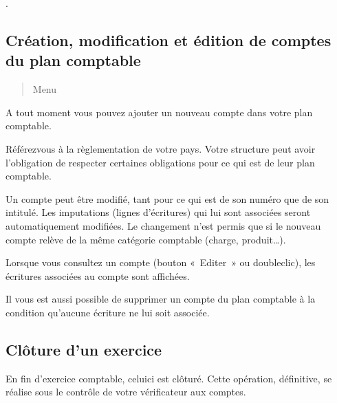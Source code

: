 \documentclass[a4paper,10pt,oneside,french]{sphinxmanual}
\begin{document}
.


\subsection{Création, modification et édition de comptes du plan comptable}
\label{\detokenize{accounting/fiscalyear:creation-modification-et-edition-de-comptes-du-plan-comptable}}\begin{quote}

Menu 
\end{quote}

A tout moment vous pouvez ajouter un nouveau compte dans votre plan comptable.
\begin{quote}

\noindent{}
\end{quote}

Référez\sphinxhyphen{}vous à la règlementation de votre pays. Votre structure peut avoir l’obligation de respecter certaines obligations pour ce qui est de leur plan comptable.

Un compte peut être modifié, tant pour ce qui est de son numéro que de son intitulé. Les imputations (lignes d’écritures) qui lui sont associées seront automatiquement modifiées. Le changement n’est permis que si le nouveau compte relève de la même catégorie comptable (charge, produit…).

Lorsque vous consultez un compte (bouton « Editer » ou double\sphinxhyphen{}clic), les écritures associées au compte sont affichées.
\begin{quote}

\noindent{}
\end{quote}

Il vous est aussi possible de supprimer un compte du plan comptable à la condition qu’aucune écriture ne lui soit associée.


\subsection{Clôture d’un exercice}
\label{\detokenize{accounting/fiscalyear:cloture-d-un-exercice}}
En fin d’exercice comptable, celui\sphinxhyphen{}ci est clôturé. Cette opération, définitive, se réalise sous le contrôle de votre
vérificateur aux comptes.
\end{document}

